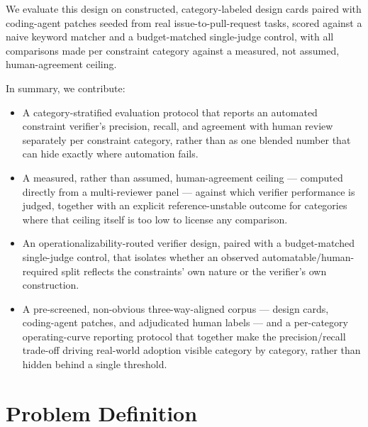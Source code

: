 \documentclass[11pt]{article}
\begin{document}
We evaluate this design on constructed, category-labeled design cards paired with coding-agent patches seeded from real issue-to-pull-request tasks, scored against a naive keyword matcher and a budget-matched single-judge control, with all comparisons made per constraint category against a measured, not assumed, human-agreement ceiling.

In summary, we contribute:
\begin{itemize}[leftmargin=1.4em]
\item A category-stratified evaluation protocol that reports an automated constraint verifier's precision, recall, and agreement with human review separately per constraint category, rather than as one blended number that can hide exactly where automation fails.
\item A measured, rather than assumed, human-agreement ceiling --- computed directly from a multi-reviewer panel --- against which verifier performance is judged, together with an explicit reference-unstable outcome for categories where that ceiling itself is too low to license any comparison.
\item An operationalizability-routed verifier design, paired with a budget-matched single-judge control, that isolates whether an observed automatable/human-required split reflects the constraints' own nature or the verifier's own construction.
\item A pre-screened, non-obvious three-way-aligned corpus --- design cards, coding-agent patches, and adjudicated human labels --- and a per-category operating-curve reporting protocol that together make the precision/recall trade-off driving real-world adoption visible category by category, rather than hidden behind a single threshold.
\end{itemize}

\section{Problem Definition}
\end{document}
